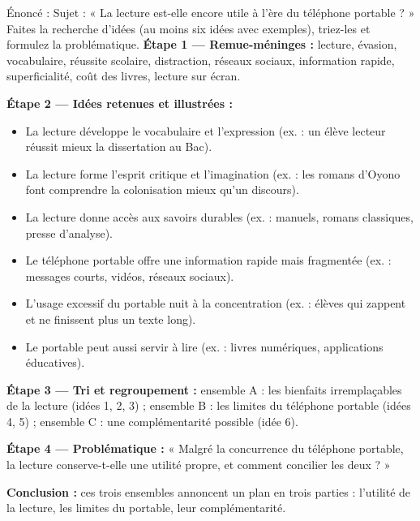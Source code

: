 \documentclass[11pt]{article}
\newcounter{popsec}
\newcounter{popsub}
\newcommand{\courssub}[1]{%
  \stepcounter{popsub}%
  \par\vspace{9pt}\noindent{\popxbold\fontsize{11.5}{13}\selectfont\color{popink}{\color{poporange}\thepopsec.\thepopsub}\hspace{6pt}#1}\par\nopagebreak\vspace{4pt}
}
\begin{document}
\begin{exoresolu}
Énoncé : Sujet : « La lecture est-elle encore utile à l'ère du téléphone portable ? » Faites la recherche d'idées (au moins six idées avec exemples), triez-les et formulez la problématique.
\tcblower
\textbf{Étape 1 — Remue-méninges :} lecture, évasion, vocabulaire, réussite scolaire, distraction, réseaux sociaux, information rapide, superficialité, coût des livres, lecture sur écran.

\textbf{Étape 2 — Idées retenues et illustrées :}
\begin{itemize}
\item La lecture développe le vocabulaire et l'expression (ex. : un élève lecteur réussit mieux la dissertation au Bac).
\item La lecture forme l'esprit critique et l'imagination (ex. : les romans d'Oyono font comprendre la colonisation mieux qu'un discours).
\item La lecture donne accès aux savoirs durables (ex. : manuels, romans classiques, presse d'analyse).
\item Le téléphone portable offre une information rapide mais fragmentée (ex. : messages courts, vidéos, réseaux sociaux).
\item L'usage excessif du portable nuit à la concentration (ex. : élèves qui zappent et ne finissent plus un texte long).
\item Le portable peut aussi servir à lire (ex. : livres numériques, applications éducatives).
\end{itemize}

\textbf{Étape 3 — Tri et regroupement :} ensemble A : les bienfaits irremplaçables de la lecture (idées 1, 2, 3) ; ensemble B : les limites du téléphone portable (idées 4, 5) ; ensemble C : une complémentarité possible (idée 6).

\textbf{Étape 4 — Problématique :} « Malgré la concurrence du téléphone portable, la lecture conserve-t-elle une utilité propre, et comment concilier les deux ? »

\textbf{Conclusion :} ces trois ensembles annoncent un plan en trois parties : l'utilité de la lecture, les limites du portable, leur complémentarité.
\end{exoresolu}

\courssub{Élaborer le plan détaillé}
\end{document}
